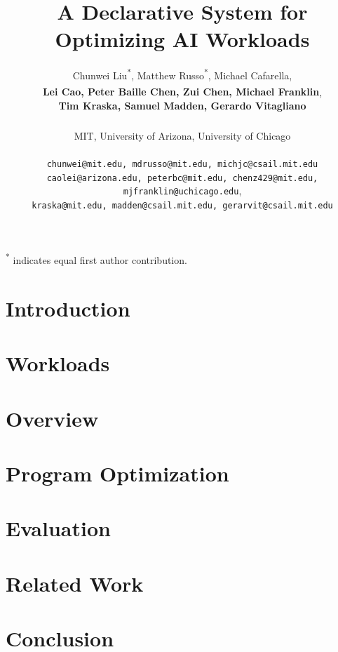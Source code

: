 \documentclass{article}
\title{A Declarative System for Optimizing AI Workloads}
\author{Chunwei Liu\textsuperscript{*}, Matthew Russo\textsuperscript{*},  Michael Cafarella,\\ 
\textbf{Lei Cao\textsuperscript{\textdagger}, Peter Baille Chen, Zui Chen, Michael Franklin\textsuperscript{\ddag}},\\ 
\textbf{Tim Kraska, Samuel Madden, Gerardo Vitagliano} \\
\\
	MIT, \textsuperscript{\textdagger}University of Arizona, \textsuperscript{\ddag}University of Chicago\\
 \\
	\texttt{chunwei@mit.edu, mdrusso@mit.edu, michjc@csail.mit.edu}\\
 \texttt{caolei@arizona.edu, peterbc@mit.edu, chenz429@mit.edu, mjfranklin@uchicago.edu},\\ \texttt{kraska@mit.edu, madden@csail.mit.edu, gerarvit@csail.mit.edu} \\
 }
\date{} 					%
\begin{document}
\maketitle



\textsuperscript{*} indicates equal first author contribution.

\section{Introduction}
\label{sec:intro}


\section{Workloads}
\label{sec:workloads}


\section{Overview}
\label{sec:overview}


\section{Program Optimization}
\label{sec:optimizations}


%

\section{Evaluation}
\label{sec:evaluation}


\section{Related Work}
\label{sec:relatedwork}


\section{Conclusion}
\label{sec:conclusion}



\end{document}

